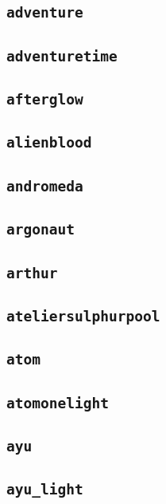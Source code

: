 \subsection{\texttt{adventure}}
\newpage
\subsection{\texttt{adventuretime}}
\newpage
\subsection{\texttt{afterglow}}
\newpage
\subsection{\texttt{alienblood}}
\newpage
\subsection{\texttt{andromeda}}
\newpage
\subsection{\texttt{argonaut}}
\newpage
\subsection{\texttt{arthur}}
\newpage
\subsection{\texttt{ateliersulphurpool}}
\newpage
\subsection{\texttt{atom}}
\newpage
\subsection{\texttt{atomonelight}}
\newpage
\subsection{\texttt{ayu}}
\newpage
\subsection{\texttt{ayu\_light}}
\newpage
